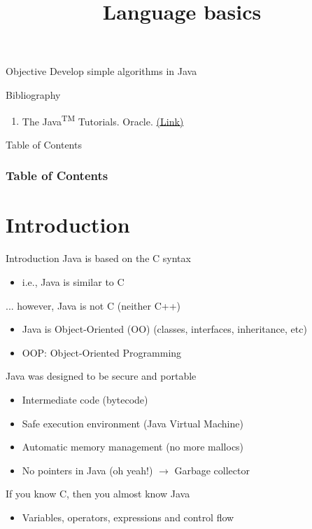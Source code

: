 \documentclass[10pt,compress]{beamer} %
\title[Language basics]{Language basics}
\author{}
\institute{\asignatura}
\date{}
\begin{document}
{\titlepageBlue
    \begin{frame}
        \titlepage
    \end{frame}
}

\begin{frame}[plain]{}
   \begin{block}{Objective}
       Develop simple algorithms in Java
   \end{block}

   \begin{block}{Bibliography}
      \begin{enumerate}
          \item The Java\textsuperscript{TM} Tutorials. Oracle. \href{https://docs.oracle.com/javase/tutorial/}{(Link)}
      \end{enumerate} 
   \end{block}

\end{frame}


{
\eliminarNavegacion
\begin{frame}[shrink]{Table of Contents}
 \frametitle{Table of Contents}
 \tableofcontents
\end{frame}
}

\section{Introduction}
\begin{frame}{Introduction}
	Java is based on the C syntax
		\begin{itemize}
		\item i.e., Java is similar to C
		\end{itemize}
	... however, Java is not C (neither C++)
		\begin{itemize}
		\item Java is Object-Oriented (OO) (classes, interfaces, inheritance, etc)
		\item OOP: Object-Oriented Programming
		\end{itemize}
	Java was designed to be secure and portable
		\begin{itemize}
		\item Intermediate code (bytecode)
		\item Safe execution environment (Java Virtual Machine)
		\item Automatic memory management (no more mallocs)
		\item No pointers in Java (oh yeah!) $\rightarrow$ \alert{Garbage collector}
		\end{itemize}
	If you know C, then you almost know Java
		\begin{itemize}
		\item Variables, operators, expressions and control flow
		\end{itemize}
\end{frame}
\end{document}
